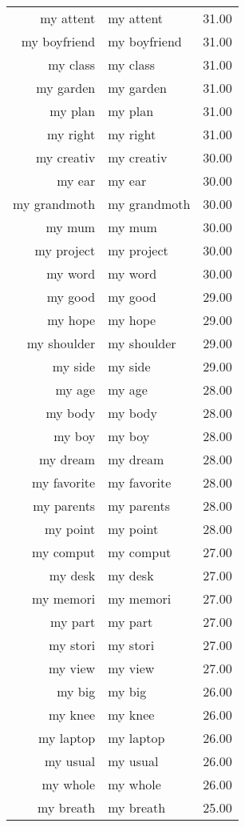 \begin{table}[ht]
\begin{tabular}{rlr}
  my attent & my attent & 31.00 \\ 
  my boyfriend & my boyfriend & 31.00 \\ 
  my class & my class & 31.00 \\ 
  my garden & my garden & 31.00 \\ 
  my plan & my plan & 31.00 \\ 
  my right & my right & 31.00 \\ 
  my creativ & my creativ & 30.00 \\ 
  my ear & my ear & 30.00 \\ 
  my grandmoth & my grandmoth & 30.00 \\ 
  my mum & my mum & 30.00 \\ 
  my project & my project & 30.00 \\ 
  my word & my word & 30.00 \\ 
  my good & my good & 29.00 \\ 
  my hope & my hope & 29.00 \\ 
  my shoulder & my shoulder & 29.00 \\ 
  my side & my side & 29.00 \\ 
  my age & my age & 28.00 \\ 
  my body & my body & 28.00 \\ 
  my boy & my boy & 28.00 \\ 
  my dream & my dream & 28.00 \\ 
  my favorite & my favorite & 28.00 \\ 
  my parents & my parents & 28.00 \\ 
  my point & my point & 28.00 \\ 
  my comput & my comput & 27.00 \\ 
  my desk & my desk & 27.00 \\ 
  my memori & my memori & 27.00 \\ 
  my part & my part & 27.00 \\ 
  my stori & my stori & 27.00 \\ 
  my view & my view & 27.00 \\ 
  my big & my big & 26.00 \\ 
  my knee & my knee & 26.00 \\ 
  my laptop & my laptop & 26.00 \\ 
  my usual & my usual & 26.00 \\ 
  my whole & my whole & 26.00 \\ 
  my breath & my breath & 25.00 \\ 

\end{tabular}
\end{table}
